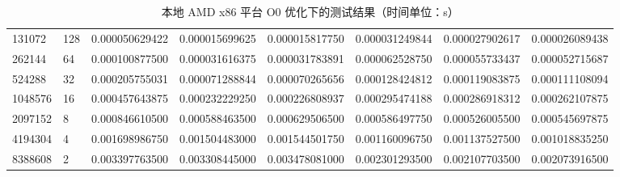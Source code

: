 \documentclass[a4paper]{article}
\begin{document}
\begin{table}[]
{\begin{tabular}{llllllll}
      131072  & 128     & 0.000050629422 & 0.000015699625  & 0.000015817750 & 0.000031249844 & 0.000027902617 & 0.000026089438 \\
      262144  & 64      & 0.000100877500 & 0.000031616375  & 0.000031783891 & 0.000062528750 & 0.000055733437 & 0.000052715687 \\
      524288  & 32      & 0.000205755031 & 0.000071288844  & 0.000070265656 & 0.000128424812 & 0.000119083875 & 0.000111108094 \\
      1048576 & 16      & 0.000457643875 & 0.000232229250  & 0.000226808937 & 0.000295474188 & 0.000286918312 & 0.000262107875 \\
      2097152 & 8       & 0.000846610500 & 0.000588463500  & 0.000629506500 & 0.000586497750 & 0.000526005500 & 0.000545697875 \\
      4194304 & 4       & 0.001698986750 & 0.001504483000  & 0.001544501750 & 0.001160096750 & 0.001137527500 & 0.001018835250 \\
      8388608 & 2       & 0.003397763500 & 0.003308445000  & 0.003478081000 & 0.002301293500 & 0.002107703500 & 0.002073916500
    \end{tabular}%
  }
  \caption{本地 AMD x86 平台 O0 优化下的测试结果（时间单位：s）}
  \label{tab:x86-O0-test}
\end{table}
\end{document}
